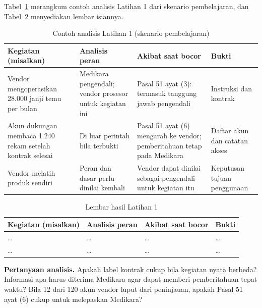 Tabel~\ref{tab:ch07-lat1-contoh} merangkum contoh analisis Latihan 1 dari skenario pembelajaran, dan
Tabel~\ref{tab:ch07-lat1-hasil} menyediakan lembar isiannya.

\begin{table}[!htb]
  \centering\small
  \caption{Contoh analisis Latihan 1 (skenario pembelajaran)}\label{tab:ch07-lat1-contoh}
  \begin{tabularx}{\textwidth}{|>{\raggedright\arraybackslash}X|>{\raggedright\arraybackslash}X|>{\raggedright\arraybackslash}X|>{\raggedright\arraybackslash}p{}|}
    \hline
    \textbf{Kegiatan (misalkan)} & \textbf{Analisis peran} & \textbf{Akibat saat bocor} &
    \textbf{Bukti} \\ \hline
    Vendor mengoperasikan 28.000 janji temu per bulan & Medikara pengendali; vendor prosesor untuk
    kegiatan ini & Pasal 51 ayat (3): termasuk tanggung jawab pengendali & Instruksi dan kontrak \\
    \hline
    Akun dukungan membaca 1.240 rekam setelah kontrak selesai & Di luar perintah bila terbukti &
    Pasal 51 ayat (6) mengarah ke vendor; pemberitahuan tetap pada Medikara & Daftar akun dan
    catatan akses \\ \hline
    Vendor melatih produk sendiri & Peran dan dasar perlu dinilai kembali & Vendor dapat dinilai
    sebagai pengendali untuk kegiatan itu & Keputusan tujuan penggunaan \\ \hline
  \end{tabularx}
\end{table}

\begin{table}[!htb]
  \centering\small
  \caption{Lembar hasil Latihan 1}\label{tab:ch07-lat1-hasil}
  \begin{tabularx}{\textwidth}{|>{\raggedright\arraybackslash}X|>{\raggedright\arraybackslash}X|>{\raggedright\arraybackslash}X|>{\raggedright\arraybackslash}p{}|}
    \hline
    \textbf{Kegiatan (misalkan)} & \textbf{Analisis peran} & \textbf{Akibat saat bocor} &
    \textbf{Bukti} \\ \hline
    \dots & \dots & \dots & \dots \\ \hline
    \dots & \dots & \dots & \dots \\ \hline
  \end{tabularx}
\end{table}

\textbf{Pertanyaan analisis.} Apakah label kontrak cukup bila kegiatan nyata berbeda? Informasi apa
harus diterima Medikara agar dapat memberi pemberitahuan tepat waktu? Bila 12 dari 120 akun vendor
luput dari peninjauan, apakah Pasal 51 ayat (6) cukup untuk melepaskan Medikara?

